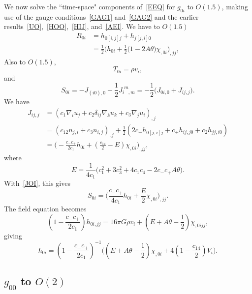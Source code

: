 \documentclass[aps,prd,preprint,amsmath,amssymb]{revtex4}
\def\beq{\begin{equation}}
\def\eeq{\end{equation}}
\def\ph{\phantom}
\def\half{\frac{1}{2}}
\begin{document}
We now solve the ``time-space" components of~\eqref{EEQ} for
$g_{0i}$ to $O(1.5)$, making use of the gauge
conditions~\eqref{GAG1} and~\eqref{GAG2} and the earlier
results~\eqref{UO},~\eqref{HOO},~\eqref{HIJ}, and~\eqref{AEI}.  We
have to $O(1.5)$
%
\beq\begin{split}
    R_{0i} &= h_{0[i,j]j} + h_{j[j,i]0} \\
        &=\half \big(h_{0i}
        +\half\big(1-2A\theta\big)
    \chi_{,0i}\big)_{,jj},
\end{split}\eeq
%
Also to $O(1.5)$,
%
\beq
    T_{0i}= \rho v_i,
\eeq
%
and
%
\beq
    S_{0i} = -J_{(i0),0} +\half J_{i\ph m,m}^{\ph i m}
        = -\half\big(J_{0i,0}+J_{ij,j}\big).
\eeq %
We have
%
\beq\begin{split}
    J_{ij,j}
    &= (c_1 \nabla_i u_j +c_2\delta_{ij}\nabla_k u_k+c_3\nabla_j u_i)_{,j}\\
        &=(c_{12}n_{j,i}+c_3n_{i,j})_{,j}
            +\half(2c_-h_{0[j,i]j}+c_+h_{ij,j0}+c_2h_{jj,i0})\\
    &= \Big(-\frac{c_- c_+}{2c_1}h_{0i}
            +(\frac{c_{14}}{2}-E) \chi_{,0i}\Big)_{,jj},
\end{split}
\eeq
%
where
%
\beq
    E = \frac{1}{4c_1}\Big(c_1^2 + 3c_3^2 + 4c_1 c_4
        - 2c_- c_+ A \theta\Big).
\eeq
%
With~\eqref{JOI}, this gives
%
\beq
    S_{0i} = \Big(\frac{c_- c_+}{4c_1}h_{0i} +
    \frac{E}{2}\chi_{,0i}\Big)_{,jj}.
\eeq
%
The field equation becomes
%
\beq
    (1-\frac{c_- c_+}{2c_1})h_{0i,jj} = 16\pi G \rho v_i
        +(E+A\theta-\half)\chi_{,0ijj},
\eeq
%
giving
%
\beq\label{HOI}
    h_{0i} = (1-\frac{c_-c_+}{2c_1})^{-1}
        \Big((E+A\theta-\half)\chi_{,0i}
        +4(1-\frac{c_{14}}{2})V_i\Big).
\eeq
%
%
%
\subsection{$g_{00}$ to $O(2)$}
%
\end{document}
